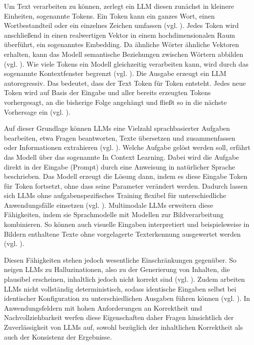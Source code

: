 Um Text verarbeiten zu können, zerlegt ein \ac{LLM} diesen zunächst in kleinere Einheiten, sogenannte Tokens. Ein Token kann ein ganzes Wort, einen Wortbestandteil oder ein einzelnes Zeichen umfassen (vgl. \cite[S.~1715~f.]{sennrich2016neural}). Jedes Token wird anschließend in einen realwertigen Vektor in einem hochdimensionalen Raum überführt, ein sogenanntes Embedding. Da ähnliche Wörter ähnliche Vektoren erhalten, kann das Modell semantische Beziehungen zwischen Wörtern abbilden (vgl. \cite[S. 1137 ff.]{bengio2003neural}). Wie viele Tokens ein Modell gleichzeitig verarbeiten kann, wird durch das sogenannte Kontextfenster begrenzt (vgl. \cite[S.~157~f.]{liu2024lost}). Die Ausgabe erzeugt ein \ac{LLM} autoregressiv. Das bedeutet, dass der Text Token für Token entsteht. Jedes neue Token wird auf Basis der Eingabe und aller bereits erzeugten Tokens vorhergesagt, an die bisherige Folge angehängt und fließt so in die nächste Vorhersage ein (vgl. \cite[S.~1138]{bengio2003neural}).

Auf dieser Grundlage können \acp{LLM} eine Vielzahl sprachbasierter Aufgaben bearbeiten, etwa Fragen beantworten, Texte übersetzen und zusammenfassen oder Informationen extrahieren (vgl. \cite[S.~1]{zhao2023survey}). Welche Aufgabe gelöst werden soll, erfährt das Modell über das sogenannte In Context Learning. Dabei wird die Aufgabe direkt in der Eingabe (Prompt) durch eine Anweisung in natürlicher Sprache beschrieben. Das Modell erzeugt die Lösung dann, indem es diese Eingabe Token für Token fortsetzt, ohne dass seine Parameter verändert werden. Dadurch lassen sich \acp{LLM} ohne aufgabenspezifisches Training flexibel für unterschiedliche Anwendungsfälle einsetzen (vgl. \cite[S.~1877~f.]{brown2020language}). Multimodale \acp{LLM} erweitern diese Fähigkeiten, indem sie Sprachmodelle mit Modellen zur Bildverarbeitung kombinieren. So können auch visuelle Eingaben interpretiert und beispielsweise in Bildern enthaltene Texte ohne vorgelagerte Texterkennung ausgewertet werden (vgl. \cite[S.~1]{yin2024survey}).

Diesen Fähigkeiten stehen jedoch wesentliche Einschränkungen gegenüber. So neigen \acp{LLM} zu Halluzinationen, also zu der Generierung von Inhalten, die plausibel erscheinen, inhaltlich jedoch nicht korrekt sind (vgl. \cite[S.~1~f.]{huang2025survey}). Zudem arbeiten \acp{LLM} nicht vollständig deterministisch, sodass identische Eingaben selbst bei identischer Konfiguration zu unterschiedlichen Ausgaben führen können (vgl. \cite[S.~1]{ouyang2025empirical}). In Anwendungsfeldern mit hohen Anforderungen an Korrektheit und Nachvollziehbarkeit werfen diese Eigenschaften daher Fragen hinsichtlich der Zuverlässigkeit von \acp{LLM} auf, sowohl bezüglich der inhaltlichen Korrektheit als auch der Konsistenz der Ergebnisse.

